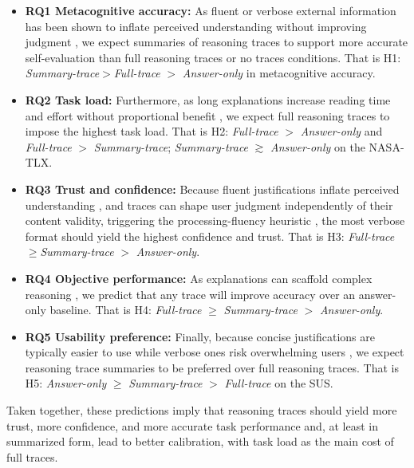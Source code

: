 \documentclass[manuscript, anonymous=false,authorversion,review=false]{acmart}
\begin{document}
\begin{itemize}
    \item \textbf{RQ1 Metacognitive accuracy:} As fluent or verbose external information has been shown to inflate perceived understanding without improving judgment \cite{fisher2021harder, alter2009uniting}, we expect summaries of reasoning traces to support more accurate self-evaluation than full reasoning traces or no traces conditions. That is H1: \textit{Summary-trace}$>$\textit{Full-trace} $>$ \textit{Answer-only} in metacognitive accuracy.
    \item \textbf{RQ2 Task load:} Furthermore, as long explanations increase reading time and effort without proportional benefit \cite{vasconcelos2023explanations, bertrand2022cognitive}, we expect full reasoning traces to impose the highest task load. That is H2: \textit{Full-trace} $>$ \textit{Answer-only} and \textit{Full-trace} $>$ \textit{Summary-trace}; \textit{Summary-trace} $\gtrsim$ \textit{Answer-only} on the NASA-TLX.
    \item \textbf{RQ3 Trust and confidence:} Because fluent justifications inflate perceived understanding \cite{fisher2021harder}, and traces can shape user judgment independently of their content validity, triggering the processing-fluency heuristic \cite{alter_overcoming_2007}, the most verbose format should yield the highest confidence and trust. That is H3: \textit{Full-trace} $\geq $\textit{Summary-trace} $>$ \textit{Answer-only}.
    \item \textbf{RQ4 Objective performance:} As explanations can scaffold complex reasoning \cite{10.1145/3411764.3445717,tankelevitch2023metacognitive}, we predict that any trace will improve accuracy over an answer-only baseline. That is H4: \textit{Full-trace} $\geq$ \textit{Summary-trace} $>$ \textit{Answer-only}.
    \item \textbf{RQ5 Usability preference:} Finally, because concise justifications are typically easier to use while verbose ones risk overwhelming users \cite{MILLER20191}, we expect reasoning trace summaries to be preferred over full reasoning traces. That is H5: \textit{Answer-only} $\geq$ \textit{Summary-trace} $>$ \textit{Full-trace} on the SUS.
\end{itemize}

Taken together, these predictions imply that reasoning traces should yield more trust, more confidence, and more accurate task performance and, at least in summarized form, lead to better calibration, with task load as the main cost of full traces.
\end{document}
